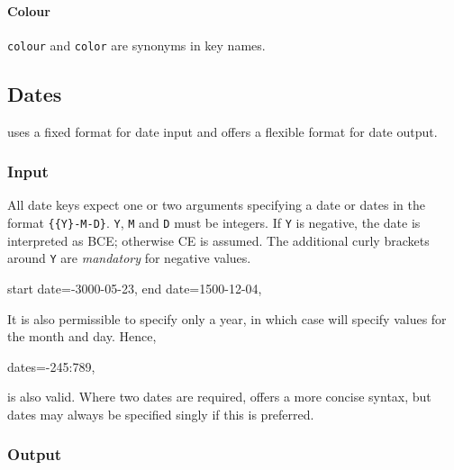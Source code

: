 \documentclass[10pt,british,a4paper]{ltxdoc}
\newcommand*\pkg[1]{\textpkg{#1}}
\newcommand*\Pkg[1]{\textpkg{\MakeUppercase#1}}
\begin{document}
\paragraph{Colour\label{nod:colour}}
\texttt{colour} and \texttt{color} are synonyms in key names.






\subsection{Dates}\label{subsec:dyddiadau}

\Pkg{chronos} uses a fixed format for date input and offers a flexible format for date output.

\subsubsection{Input}\label{subsubsec:dyddiad-input}

All date keys expect one or two arguments specifying a date or dates in the format \texttt{\{\{Y\}-M-D\}}.
\texttt{Y}, \texttt{M} and \texttt{D} must be integers.
If \texttt{Y} is negative, the date is interpreted as BCE; otherwise CE is assumed.
The additional curly brackets around \texttt{Y} are \emph{mandatory} for negative values.
\begin{chronoscode}
  start date={{-3000}-05-23},
  end date={1500-12-04},
\end{chronoscode}
It is also permissible to specify only a year, in which case \pkg{chronos} will specify values for the month and day.
Hence,
\begin{chronoscode}
  dates={-245}:789,
\end{chronoscode}
is also valid. 
Where two dates are required,  offers a more concise syntax, but dates may always be specified singly if this is preferred.


\subsubsection{Output}\label{subsubsec:dyddiad-output}
\end{document}

